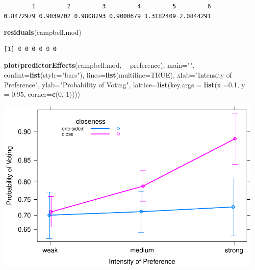 \documentclass[
]{article}
\newenvironment{Shaded}{\begin{snugshade}}{\end{snugshade}}
\newcommand{\DataTypeTok}[1]{\textcolor[rgb]{0.13,0.29,0.53}{#1}}
\newcommand{\DecValTok}[1]{\textcolor[rgb]{0.00,0.00,0.81}{#1}}
\newcommand{\FloatTok}[1]{\textcolor[rgb]{0.00,0.00,0.81}{#1}}
\newcommand{\KeywordTok}[1]{\textcolor[rgb]{0.13,0.29,0.53}{\textbf{#1}}}
\newcommand{\NormalTok}[1]{#1}
\newcommand{\OperatorTok}[1]{\textcolor[rgb]{0.81,0.36,0.00}{\textbf{#1}}}
\newcommand{\OtherTok}[1]{\textcolor[rgb]{0.56,0.35,0.01}{#1}}
\newcommand{\StringTok}[1]{\textcolor[rgb]{0.31,0.60,0.02}{#1}}
\begin{document}
\begin{verbatim}
        1         2         3         4         5         6 
0.8472979 0.9039702 0.9808293 0.9000679 1.3182409 2.0844291 
\end{verbatim}

\begin{Shaded}
\begin{Highlighting}[]
\KeywordTok{residuals}\NormalTok{(campbell.mod)}
\end{Highlighting}
\end{Shaded}

\begin{verbatim}
[1] 0 0 0 0 0 0
\end{verbatim}

\begin{Shaded}
\begin{Highlighting}[]
\KeywordTok{plot}\NormalTok{(}\KeywordTok{predictorEffects}\NormalTok{(campbell.mod, }\OperatorTok{~}\StringTok{ }\NormalTok{preference),  }
     \DataTypeTok{main=}\StringTok{""}\NormalTok{, }\DataTypeTok{confint=}\KeywordTok{list}\NormalTok{(}\DataTypeTok{style=}\StringTok{"bars"}\NormalTok{), }\DataTypeTok{lines=}\KeywordTok{list}\NormalTok{(}\DataTypeTok{multiline=}\OtherTok{TRUE}\NormalTok{),}
     \DataTypeTok{xlab=}\StringTok{"Intensity of Preference"}\NormalTok{, }\DataTypeTok{ylab=}\StringTok{"Probability of Voting"}\NormalTok{,}
     \DataTypeTok{lattice=}\KeywordTok{list}\NormalTok{(}\DataTypeTok{key.args =} \KeywordTok{list}\NormalTok{(}\DataTypeTok{x =}\FloatTok{0.1}\NormalTok{, }\DataTypeTok{y =} \FloatTok{0.95}\NormalTok{, }\DataTypeTok{corner=}\KeywordTok{c}\NormalTok{(}\DecValTok{0}\NormalTok{, }\DecValTok{1}\NormalTok{))))}
\end{Highlighting}
\end{Shaded}

\includegraphics{LogisticRegressCh6_files/figure-latex/unnamed-chunk-10-1.pdf}
\end{document}
